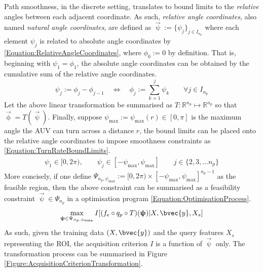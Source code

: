 			Path smoothness, in the discrete setting, translates to bound limits to the \textit{relative} angles between each adjacent coordinate. As such, \textit{relative angle coordinates}, also named \textit{natural angle coordinates}, are defined as $\vec{\uppsi} := \{\psi_{j}\}_{j \in I_{n_{p}}}$ where each element $\psi_{j}$ is related to absolute angle coordinates by \eqref{Equation:RelativeAngleCoordinates}, where $\phi_{0} := 0$ by definition. That is, beginning with $\psi_{1} = \phi_{1}$, the absolute angle coordinates can be obtained by the cumulative sum of the relative angle coordinates. \begin{equation}
				\psi_{j} := \phi_{j} - \phi_{j - 1}	\quad \iff \quad \phi_{j} := \sum_{k = 1}^{j} \psi_{k} \qquad \forall j \in I_{n_{p}}
			\label{Equation:RelativeAngleCoordinates}
			\end{equation} Let the above linear transformation be summarised as $T: \mathbb{R}^{n_{p}} \mapsto \mathbb{R}^{n_{p}}$ so that $\vec{\upphi} = T(\vec{\uppsi})$. Finally, suppose $\psi_{\mathrm{max}} := \psi_{\mathrm{max}}(r) \in [0, \pi]$ is the maximum angle the AUV can turn across a distance $r$, the bound limits can be placed onto the relative angle coordinates to impose smoothness constraints as \eqref{Equation:TurnRateBoundLimits}. \begin{equation}
				\begin{aligned}
					\psi_{1} \in [0, 2 \pi), \qquad
					\psi_{j} \in [-\psi_{\mathrm{max}}, \psi_{\mathrm{max}}] \qquad j \in \{2, 3, \dots n_{p}\}
				\end{aligned}
			\label{Equation:TurnRateBoundLimits}
			\end{equation} More concisely, if one define $\Psi_{n_{p}, \psi_{\mathrm{max}}} := [0, 2 \pi) \times [-\psi_{\mathrm{max}}, \psi_{\mathrm{max}}]^{n_{p} - 1}$ as the feasible region, then the above constraint can be summarised as a feasibility constraint $\vec{\uppsi} \in \Psi_{n_{p}}$ in a optimisation program \eqref{Equation:OptimisationProcess}. \begin{equation}
				\max_{\vec{\uppsi} \in \Psi_{n_{p}, \psi_{\mathrm{max}}}} I[(f_{e} \circ q_{p} \circ T)(\vec{\uppsi}) | X, \bvec{y}, X_{s}]				
			\label{Equation:OptimisationProcess}
			\end{equation} As such, given the training data $(X, \bvec{y})$ and the query features $X_{s}$ representing the ROI, the acquisition criterion $I$ is a function of $\vec{\uppsi}$ only. The transformation process can be summarised in Figure \ref{Figure:AcquisitionCriterionTransformation}.
			
